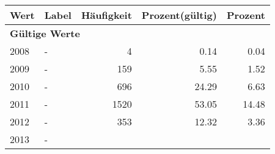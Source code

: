      \begin{longtable}{lXrrr}
     \toprule
     \textbf{Wert} & \textbf{Label} & \textbf{Häufigkeit} & \textbf{Prozent(gültig)} & \textbf{Prozent} \\
     \endhead
     \midrule
     \multicolumn{5}{l}{\textbf{Gültige Werte}}\\

     2008 &
     \multicolumn{1}{X}{ -  } &


       \num{4} &
       \num[round-mode=places,round-precision=2]{0,14} &
         \num[round-mode=places,round-precision=2]{0,04} \\

     2009 &
     \multicolumn{1}{X}{ -  } &


       \num{159} &
       \num[round-mode=places,round-precision=2]{5,55} &
         \num[round-mode=places,round-precision=2]{1,52} \\

     2010 &
     \multicolumn{1}{X}{ -  } &


       \num{696} &
       \num[round-mode=places,round-precision=2]{24,29} &
         \num[round-mode=places,round-precision=2]{6,63} \\

     2011 &
     \multicolumn{1}{X}{ -  } &


       \num{1520} &
       \num[round-mode=places,round-precision=2]{53,05} &
         \num[round-mode=places,round-precision=2]{14,48} \\

     2012 &
     \multicolumn{1}{X}{ -  } &


       \num{353} &
       \num[round-mode=places,round-precision=2]{12,32} &
         \num[round-mode=places,round-precision=2]{3,36} \\

     2013 &
     \multicolumn{1}{X}{ -  } &



\end{longtable}
